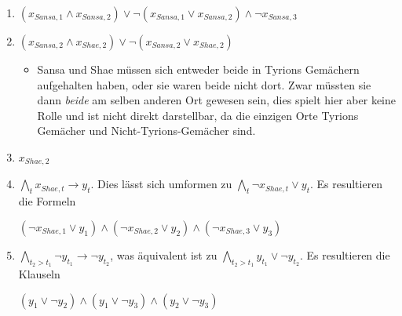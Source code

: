\documentclass{article}
\begin{document}
\begin{enumerate}
      Es resultieren die Klauseln:

      $\neg(x_{Stannis,1} \wedge x_{Stannis,2}) \wedge \neg(x_{Shae,1} \wedge
      x_{Shae,2})\wedge\neg(x_{Stannis,1} \wedge x_{Stannis,3}) \wedge
      \neg(x_{Shae,1} \wedge x_{Shae,3})\wedge\neg(x_{Stannis,2} \wedge
      x_{Stannis,3}) \wedge \neg(x_{Shae,2} \wedge x_{Shae,3})$
   \item $(x_{Sansa,1} \wedge x_{Sansa,2}) \vee \neg(x_{Sansa,1} \vee
      x_{Sansa,2}) \wedge \neg x_{Sansa,3}$
   \item $(x_{Sansa,2} \wedge x_{Shae,2}) \vee \neg(x_{Sansa,2} \vee x_{Shae,2})$
      \begin{itemize}[label=$\rightarrow$]
         \item Sansa und Shae müssen sich entweder beide in Tyrions Gemächern
            aufgehalten haben, oder sie waren beide nicht dort. Zwar müssten sie
            dann \emph{beide} am selben anderen Ort gewesen sein, dies spielt
            hier aber keine Rolle und ist nicht direkt darstellbar, da die
            einzigen Orte Tyrions Gemächer und Nicht-Tyrions-Gemächer sind.
      \end{itemize}
   \item $x_{Shae,2}$
   \item $\bigwedge\limits_t x_{Shae,t} \rightarrow y_t$. Dies lässt sich
      umformen zu $\bigwedge\limits_t \neg x_{Shae,t} \vee y_t$.
      Es resultieren die Formeln

      $(\neg x_{Shae,1} \vee y_1) \wedge (\neg x_{Shae,2} \vee y_2) \wedge (\neg
      x_{Shae,3} \vee y_3)$
   \item[(8*)] $\bigwedge\limits_{t_2 > t_1} \neg y_{t_1} \rightarrow \neg y_{t_2}$,
      was äquivalent ist zu $\bigwedge\limits_{t_2 > t_1} y_{t_1} \vee \neg
      y_{t_2}$. 
      Es resultieren die Klauseln

      $(y_{1} \vee \neg y_{2}) \wedge (y_{1} \vee \neg y_{3}) \wedge (y_{2} \vee
      \neg y_{3})$
\end{enumerate}
\end{document}
